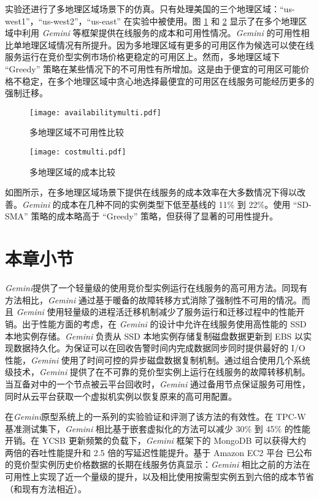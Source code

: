 实验还进行了多地理区域场景下的仿真。只有处理美国的三个地理区域：``us-west1''，``us-west2''，``us-east'' 在实验中被使用。图 \ref{figure:unavailabilitymulti} 和 \ref{figure:costmulti} 显示了在多个地理区域中利用 \emph{Gemini} 等框架提供在线服务的成本和可用性情况。\emph{Gemini} 的可用性相比单地理区域情况有所提升。因为多地理区域有更多的可用区作为候选可以使在线服务运行在竞价型实例市场价格更稳定的可用区上。然而，多地理区域下 ``Greedy'' 策略在某些情况下的不可用性有所增加。这是由于便宜的可用区可能价格不稳定，在多个地理区域中贪心地选择最便宜的可用区在线服务可能经历更多的强制迁移。
\begin{figure}[]
  \centering
  \texttt{[image: availabilitymulti.pdf]}
  \caption{多地理区域不可用性比较}
  \label{figure:unavailabilitymulti}
\end{figure}

\begin{figure}[]
  \centering
  \texttt{[image: costmulti.pdf]}
  \caption{多地理区域的成本比较}
  \label{figure:costmulti}
\end{figure}

如图所示，在多地理区域场景下提供在线服务的成本效率在大多数情况下得以改善。\emph{Gemini} 的成本在几种不同的实例类型下低至基线的 11\% 到 22\%。使用 ``SD-SMA'' 策略的成本略高于 ``Greedy'' 策略，但获得了显著的可用性提升。

\section{本章小节}
\emph{Gemini}提供了一个轻量级的使用竞价型实例运行在线服务的高可用方法。同现有方法相比，\emph{Gemini} 通过基于暖备的故障转移方式消除了强制性不可用的情况。而且 \emph{Gemini} 使用轻量级的进程活迁移机制减少了服务运行和迁移过程中的性能开销。出于性能方面的考虑，在 \emph{Gemini} 的设计中允许在线服务使用高性能的 SSD 本地实例存储。\emph{Gemini} 负责从 SSD 本地实例存储复制磁盘数据更新到 EBS 以实现数据持久化。为保证可以在回收告警时间内完成数据同步同时提供最好的 I/O 性能，\emph{Gemini} 使用了时间可控的异步磁盘数据复制机制。通过组合使用几个系统级技术，\emph{Gemini} 提供了在不可靠的竞价型实例上运行在线服务的故障转移机制。当互备对中的一个节点被云平台回收时，\emph{Gemini} 通过备用节点保证服务可用性，同时从云平台获取一个虚拟机实例以恢复原来的高可用配置。

在\emph{Gemini}原型系统上的一系列的实验验证和评测了该方法的有效性。在 TPC-W 基准测试集下，\emph{Gemini} 相比基于嵌套虚拟化的方法可以减少 30\% 到 45\% 的性能开销。在 YCSB 更新频繁的负载下，\emph{Gemini} 框架下的 MongoDB 可以获得大约两倍的吞吐性能提升和 2.5 倍的写延迟性能提升。基于 Amazon EC2 平台 已公布的竞价型实例历史价格数据的长期在线服务仿真显示：\emph{Gemini} 相比之前的方法在可用性上实现了近一个量级的提升，以及相比使用按需型实例五到六倍的成本节省（和现有方法相近）。